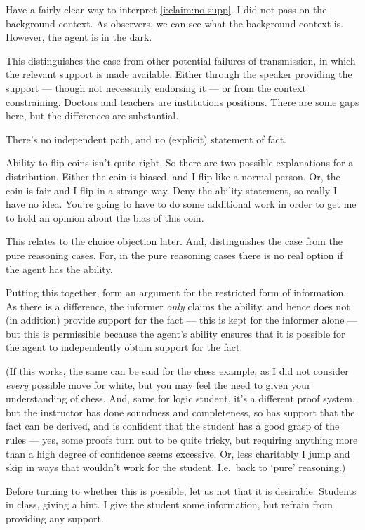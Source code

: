 \documentclass[10pt]{article}
\begin{document}
Have a fairly clear way to interpret \ref{i:claim:no-supp}.
I did not pass on the background context.
As observers, we can see what the background context is.
However, the agent is in the dark.

This distinguishes the case from other potential failures of transmission, in which the relevant support is made available.
Either through the speaker providing the support --- though not necessarily endorsing it --- or from the context constraining.
Doctors and teachers are institutions positions.
There are some gaps here, but the differences are substantial.

There's no independent path, and no (explicit) statement of fact.

Ability to flip coins isn't quite right.
So there are two possible explanations for a distribution.
Either the coin is biased, and I flip like a normal person.
Or, the coin is fair and I flip in a strange way.
Deny the ability statement, so really I have no idea.
You're going to have to do some additional work in order to get me to hold an opinion about the bias of this coin.

{
  \color{red}
  This relates to the choice objection later.
  And, distinguishes the case from the pure reasoning cases.
  For, in the pure reasoning cases there is no real option if the agent has the ability.
}



Putting this together, form an argument for the restricted form of information.
As there is a difference, the informer \emph{only} claims the ability, and hence does not (in addition) provide support for the fact --- this is kept for the informer alone --- but this is permissible because the agent's ability ensures that it is possible for the agent to independently obtain support for the fact.

(If this works, the same can be said for the chess example, as I did not consider \emph{every} possible move for white, but you may feel the need to given your understanding of chess.
And, same for logic student, it's a different proof system, but the instructor has done soundness and completeness, so has support that the fact can be derived, and is confident that the student has a good grasp of the rules --- yes, some proofs turn out to be quite tricky, but requiring anything more than a high degree of confidence seems excessive.
Or, less charitably I jump and skip in ways that wouldn't work for the student.
I.e.\ back to `pure' reasoning.)

Before turning to whether this is possible, let us not that it is desirable.
Students in class, giving a hint.
I give the student some information, but refrain from providing any support.
\end{document}
